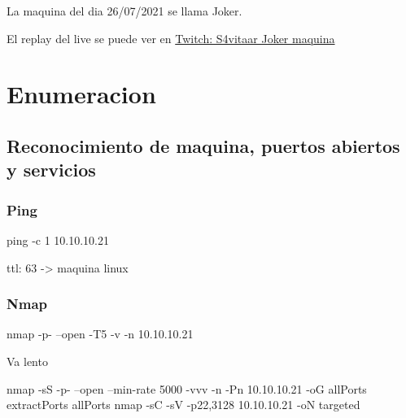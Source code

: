 \documentclass{assets/ipesethesis}
\newenvironment{Shaded}{\begin{snugshade}}{\end{snugshade}}
\newcommand{\ExtensionTok}[1]{#1}
\newcommand{\FunctionTok}[1]{\textcolor[rgb]{0.00,0.00,0.00}{#1}}
\newcommand{\NormalTok}[1]{#1}
\begin{document}
La maquina del dia 26/07/2021 se llama Joker.

El replay del live se puede ver en \href{https://www.twitch.tv/videos/1098850596}{Twitch: S4vitaar Joker maquina}

\hypertarget{enumeracion-3}{%
\section*{Enumeracion}\label{enumeracion-3}}

\hypertarget{reconocimiento-de-maquina-puertos-abiertos-y-servicios-3}{%
\subsection*{Reconocimiento de maquina, puertos abiertos y servicios}\label{reconocimiento-de-maquina-puertos-abiertos-y-servicios-3}}

\hypertarget{ping-3}{%
\subsubsection*{Ping}\label{ping-3}}

\begin{Shaded}
\begin{Highlighting}[]
\FunctionTok{ping}\NormalTok{ -c 1 10.10.10.21}
\end{Highlighting}
\end{Shaded}

ttl: 63 -\textgreater{} maquina linux

\hypertarget{nmap-3}{%
\subsubsection*{Nmap}\label{nmap-3}}

\begin{Shaded}
\begin{Highlighting}[]
\FunctionTok{nmap}\NormalTok{ -p- --open -T5 -v -n 10.10.10.21 }
\end{Highlighting}
\end{Shaded}

Va lento

\begin{Shaded}
\begin{Highlighting}[]
\FunctionTok{nmap}\NormalTok{ -sS -p- --open --min-rate 5000 -vvv -n -Pn 10.10.10.21 -oG allPorts }
\ExtensionTok{extractPorts}\NormalTok{ allPorts}
\FunctionTok{nmap}\NormalTok{ -sC -sV -p22,3128 10.10.10.21 -oN targeted}
\end{Highlighting}
\end{Shaded}
\end{document}
